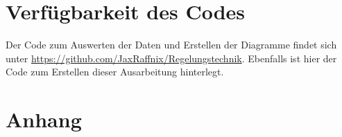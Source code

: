 \documentclass[
    paper=a4,
    fontsize=10pt,
    DIV=calc,
    twocolumn,
    oneside,
]{scrartcl}
\begin{document}
\section{Verfügbarkeit des Codes}
    Der Code zum Auswerten der Daten und Erstellen der Diagramme findet sich unter \url{https://github.com/JaxRaffnix/Regelungstechnik}. Ebenfalls ist hier der Code zum Erstellen dieser Ausarbeitung hinterlegt.


\appendix
\section{Anhang}

    

    
\end{document}
